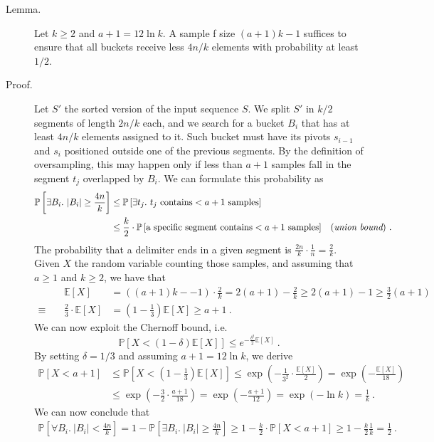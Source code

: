 \begin{enumerate}
\begin{description}
    \item[Lemma.] Let $k \ge 2$ and $a + 1 = 12 \ln k$. A sample f size $(a +
    1)k - 1$ suffices to ensure that all buckets receive less $4n/k$
    elements with probability at least $1/2$.

    \item[Proof.] Let $S'$ the sorted version of the input sequence $S$. We
    split $S'$ in $k/2$ segments of length $2n/k$ each, and we search for a
    bucket $B_i$ that has at least $4n/k$ elements assigned to it. Such bucket
    must have its pivots $s_{i-1}$ and $s_i$ positioned outside one of the
    previous segments. By the definition of oversampling, this may happen only
    if less than $a + 1$ samples fall in the segment $t_j$ overlapped by $B_i$.
    We can formulate this probability as
    \begin{align*}
      \mathbb{P}\left[\exists B_i.\ |B_i| \ge \frac{4n}{k} \right] &\le
      \mathbb{P}\left[\exists t_j.\ t_j \text{ contains} < a + 1 \text{ samples}
      \right] && \\ &\le \frac{k}{2}\cdot\mathbb{P}\left[ \text{a specific
      segment contains} < a + 1 \text{ samples} \right] && (\text{\it union
      bound})\ .
    \end{align*}
    The probability that a delimiter ends in a given segment is
    $\frac{2n}{k}\cdot\frac{1}{n} = \frac{2}{k}$. Given $X$ the random variable
    counting those samples, and assuming that $a \ge 1$ and $k \ge 2$, we have
    that
    \begin{align*}
      && \mathbb{E}\left[X\right] &= \left(\left(a + 1 \right)k -
      - 1\right)\cdot \frac{2}{k} = 2\left(a + 1 \right) - \frac{2}{k} \ge
      2\left(a + 1 \right) - 1 \ge \frac{3}{2}\left(a + 1 \right) \\ \equiv\
      && \frac{2}{3}\cdot\mathbb{E}\left[X\right] &= \left(1 -
      \frac{1}{3}\right)\mathbb{E}\left[X\right] \ge a + 1\ .
    \end{align*}
    We can now exploit the Chernoff bound, i.e. $$\mathbb{P}\left[ X < (1 -
    \delta)\mathbb{E}[X] \right] \le e^{-\frac{\delta^2}{2}\mathbb{E}[X]}\ .$$
    By setting $\delta = 1/3$ and assuming $a + 1 = 12\ln k$, we derive
    \begin{align*}
      \mathbb{P}\left[X < a + 1 \right] &\le \mathbb{P}\left[X < \left(1 -
      \frac{1}{3}\right)\mathbb{E}\left[X\right] \right] \le
      \exp\left({-\frac{1}{3^2}\cdot\frac{\mathbb{E}\left[X\right]}{2}}\right) =
      \exp\left({-\frac{\mathbb{E}\left[X\right]}{18}}\right) \\ &\le
      \exp\left({-\frac{3}{2}\cdot\frac{a + 1}{18}}\right) = \exp\left({-\frac{a
      + 1}{12}}\right) = \exp(-\ln k) = \frac{1}{k}\ .
    \end{align*}
    We can now conclude that
    \begin{align*}      
      \mathbb{P}\left[\forall B_i.\ |B_i| < \frac{4n}{k} \right] = 1 -
      \mathbb{P}\left[\exists B_i.\ |B_i| \ge \frac{4n}{k} \right] \ge 1 -
      \frac{k}{2}\cdot\mathbb{P}\left[X < a + 1 \right] \ge 1 -
      \frac{k}{2}\frac{1}{k} = \frac{1}{2}\ .
    \end{align*}


\end{description}
\end{enumerate}
